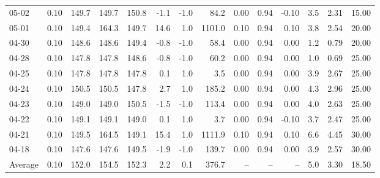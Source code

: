 \begin{threeparttable}
{\begin{tabular}{lrrrrrrrrrrrrr}
  05-02 &     0.10 & 149.7 & 149.7 & 150.8 &       -1.1 &                     -1.0 &                84.2 &       0.00 &      0.94 &          -0.10 &              3.5 &            2.31 &                  15.00 \\
  05-01 &     0.10 & 149.4 & 164.3 & 149.7 &       14.6 &                      1.0 &              1101.0 &       0.10 &      0.94 &           0.10 &              3.8 &            2.54 &                  20.00 \\
  04-30 &     0.10 & 148.6 & 148.6 & 149.4 &       -0.8 &                     -1.0 &                58.4 &       0.00 &      0.94 &           0.00 &              1.2 &            0.79 &                  20.00 \\
  04-28 &     0.10 & 147.8 & 147.8 & 148.6 &       -0.8 &                     -1.0 &                60.2 &       0.00 &      0.94 &           0.00 &              1.0 &            0.69 &                  25.00 \\
  04-25 &     0.10 & 147.8 & 147.8 & 147.8 &        0.1 &                      1.0 &                 3.5 &       0.00 &      0.94 &           0.00 &              3.9 &            2.67 &                  25.00 \\
  04-24 &     0.10 & 150.5 & 150.5 & 147.8 &        2.7 &                      1.0 &               185.2 &       0.00 &      0.94 &           0.00 &              4.3 &            2.96 &                  25.00 \\
  04-23 &     0.10 & 149.0 & 149.0 & 150.5 &       -1.5 &                     -1.0 &               113.4 &       0.00 &      0.94 &           0.00 &              4.0 &            2.63 &                  25.00 \\
  04-22 &     0.10 & 149.1 & 149.1 & 149.0 &        0.1 &                      1.0 &                 3.7 &       0.00 &      0.94 &          -0.10 &              3.7 &            2.47 &                  25.00 \\
  04-21 &     0.10 & 149.5 & 164.5 & 149.1 &       15.4 &                      1.0 &              1111.9 &       0.10 &      0.94 &           0.10 &              6.6 &            4.45 &                  30.00 \\
  04-18 &     0.10 & 147.6 & 147.6 & 149.5 &       -1.9 &                     -1.0 &               139.7 &       0.00 &      0.94 &           0.00 &              3.9 &            2.57 &                  30.00 \\
Average &     0.10 & 152.0 & 154.5 & 152.3 &        2.2 &                      0.1 &               376.7 &         -- &        -- &             -- &              5.0 &            3.30 &                  18.50 \\

\end{tabular}}
\end{threeparttable}
